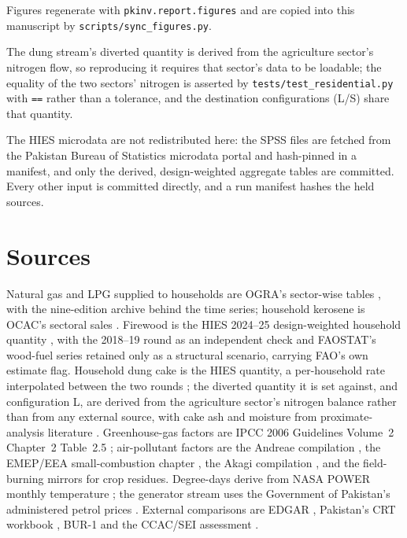 Figures regenerate with \texttt{pkinv.report.figures} and are copied into this manuscript by
\texttt{scripts/sync\_figures.py}.

The dung stream's diverted quantity is derived from the agriculture sector's nitrogen
flow, so reproducing it requires that sector's data to be loadable; the equality of the
two sectors' nitrogen is asserted by \texttt{tests/test\_residential.py} with
\texttt{==} rather than a tolerance, and the destination configurations (L/S) share
that quantity.

The HIES microdata are not redistributed here: the SPSS files are fetched from the
Pakistan Bureau of Statistics microdata portal and hash-pinned in a manifest, and
only the derived, design-weighted aggregate tables are committed. Every other
input is committed directly, and a run manifest hashes the held sources.

\section{Sources}
\label{app:sources}

Natural gas and LPG supplied to households are OGRA's sector-wise tables
\citep{ogra2024}, with the nine-edition archive \citep{ograarchive} behind the
time series; household kerosene is OCAC's sectoral sales \citep{ocacaviation}.
Firewood is the HIES 2024--25 design-weighted household quantity \citep{hies2025},
with the 2018--19 round \citep{hies2019} as an independent check and FAOSTAT's
wood-fuel series \citep{faostat} retained only as a structural scenario, carrying
FAO's own estimate flag. Household dung cake is the HIES quantity, a per-household
rate interpolated between the two rounds \citep{hies2019,hies2025}; the diverted
quantity it is set against, and configuration L, are derived from the agriculture sector's
nitrogen balance rather than from any external source, with cake ash and moisture
from proximate-analysis literature \citep{szymajda2019}. Greenhouse-gas factors
are IPCC 2006 Guidelines Volume~2 Chapter~2 Table~2.5 \citep{ipcc2006stationary};
air-pollutant factors are the Andreae compilation \citep{andreae2019}, the
EMEP/EEA small-combustion chapter \citep{emep2023smallcombustion}, the Akagi
compilation \citep{akagi2011}, and the field-burning mirrors \citep{emep2019} for
crop residues. Degree-days derive from NASA POWER monthly temperature
\citep{nasapower}; the generator stream uses the Government of Pakistan's
administered petrol prices \citep{goppetrol}. External comparisons are EDGAR
\citep{edgar2025booklet}, Pakistan's CRT workbook \citep{pakcrt2026}, BUR-1
\citep{pakbur1} and the CCAC/SEI assessment \citep{ccacsei2023}.

